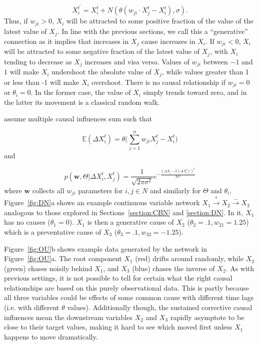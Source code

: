 \documentclass{cambridge7A}%
\newcommand{\ww}{\mathbf{w}} %
\begin{document}
\begin{equation} \label{cont_OU_def}
X_i^{t^{\prime}} = X_i^{t} + N(\theta ( w_{ji} \cdot X_j^t - X_i^t),\sigma).
\end{equation}
Thus, if $w_{ji}>0$, $X_i$ will be attracted to some positive fraction of the value of the latest value of $X_j$.  In line with the previous sections, we call this a ``generative'' connection as it implies that increases in $X_j$ cause increases in $X_i$.  If $w_{ji}<0$, $X_i$ will be attracted to some negative fraction of the latest value of $X_j$, with $X_i$ tending to decrease as $X_j$ increases and visa versa.  Values of $w_{ji}$ between $-1$ and $1$ will make $X_i$ undershoot the absolute value of $X_j$, while values greater than 1 or less than -1 will make $X_i$ overshoot. There is no causal relationship if $w_{ji}=0$ or $\theta_{i}=0$.  In the former case, the value of $X_i$ simply trends toward zero, and in the latter its movement is a classical random walk.



\cite{davis2018ctcv} assume multiple causal influences sum such that

\begin{equation}
\mathbb{E}(\Delta X_i^t) = \theta \Big(\sum_{j=1}^{n} w_{ji} X_j^t - X_i^t \Big)
\end{equation}
and

\begin{equation}
p(\ww, \Theta| \Delta X_i^t, X_j^t) = \frac{1}{\sqrt{2 \pi \sigma^2}} e^{-\frac{(\Delta X_i-\mathbb{E}(\Delta X_i^t))^2}{2 \sigma^2}}
\end{equation}
where $\ww$ collects all $w_{ji}$ parameters for $i,j\in N$ and similarly for $\Theta$ and $\theta_i$.  Figure~\ref{fig:DN}a shows an example continuous variable network $X_1\!\stackrel{+}\rightarrow\!X_2\!\stackrel{-}\rightarrow\!X_3$ analogous to those explored in Sections~\ref{section:CBN} and \ref{section:DN}.  In it, $X_1$ has no causes ($\theta_{1}=0$).  $X_1$ is then a generative cause of $X_2$ ($\theta_2=.1, w_{21} = 1.25$) which is a preventative cause of $X_3$ ($\theta_3=.1, w_{32} = -1.25$).  %

Figure~\ref{fig:OU}b shows example data generated by the network in Figure~\ref{fig:OU}a.  The root component $X_1$ (red) drifts around randomly, while $X_2$ (green) chases noisily behind $X_1$, and $X_3$ (blue) chases the inverse of $X_2$.  As with previous settings, it is not possible to tell for certain what the right causal relationships are based on this purely observational data.  This is partly because all three variables could be effects of some common cause with different time lags (i.e. with different $\theta$ values). Additionally though, the sustained corrective causal influences mean the downstream variables $X_2$ and $X_3$ rapidly asymptote to be close to their target values, making it hard to see which moved first unless $X_1$ happens to move dramatically.  
\end{document}
